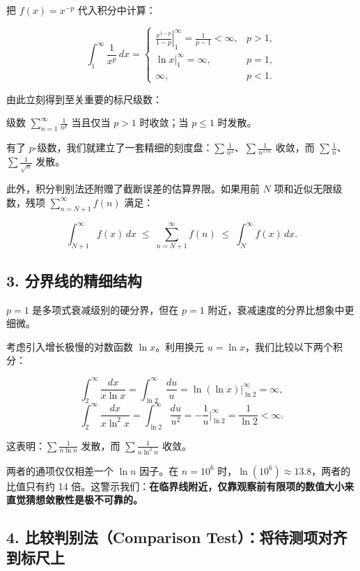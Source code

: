 把 \(f(x) = x^{-p}\) 代入积分中计算：

\[
\int_1^\infty \frac{1}{x^p}\,dx = 
\begin{cases} 
\left. \frac{x^{1-p}}{1-p} \right|_1^\infty = \frac{1}{p-1} < \infty, & p > 1, \\[6pt]
\left. \ln x \right|_1^\infty = \infty, & p = 1, \\[6pt]
\infty, & p < 1.
\end{cases}
\]

由此立刻得到至关重要的标尺级数：

\begin{theorem}
级数 \(\sum_{n=1}^\infty \frac{1}{n^p}\) 当且仅当 \(p > 1\) 时收敛；当 \(p \le 1\) 时发散。
\end{theorem}

有了 \(p\)-级数，我们就建立了一套精细的刻度盘：\(\sum \frac{1}{n^2}\)、\(\sum \frac{1}{n^{1.01}}\) 收敛，而 \(\sum \frac{1}{n}\)、\(\sum \frac{1}{\sqrt{n}}\) 发散。

此外，积分判别法还附赠了截断误差的估算界限。如果用前 \(N\) 项和近似无限级数，残项 \(\sum_{n=N+1}^\infty f(n)\) 满足：

\[
\int_{N+1}^{\infty}f(x)\,dx \;\le\; \sum_{n=N+1}^\infty f(n) \;\le\; \int_{N}^{\infty}f(x)\,dx.
\]

\subsection{3. 分界线的精细结构}

\(p=1\) 是多项式衰减级别的硬分界，但在 \(p=1\) 附近，衰减速度的分界比想象中更细微。

考虑引入增长极慢的对数函数 \(\ln x\)。利用换元 \(u = \ln x\)，我们比较以下两个积分：

\[
\int_2^\infty \frac{dx}{x \ln x} = \int_{\ln 2}^{\infty} \frac{du}{u} = \ln(\ln x)\Big|_{\ln 2}^\infty = \infty,
\]
\[
\int_2^\infty \frac{dx}{x \ln^2 x} = \int_{\ln 2}^{\infty} \frac{du}{u^2} = -\frac{1}{u}\Big|_{\ln 2}^\infty = \frac{1}{\ln 2} < \infty.
\]

这表明：\(\sum \frac{1}{n\ln n}\) 发散，而 \(\sum \frac{1}{n\ln^2 n}\) 收敛。

两者的通项仅仅相差一个 \(\ln n\) 因子。在 \(n = 10^6\) 时，\(\ln(10^6) \approx 13.8\)，两者的比值只有约 14 倍。这警示我们：\textbf{在临界线附近，仅靠观察前有限项的数值大小来直觉猜想敛散性是极不可靠的。}


\subsection{4. 比较判别法（Comparison Test）：将待测项对齐到标尺上}

